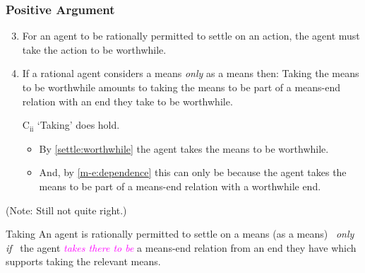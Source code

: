 \documentclass[noamssymb, compress, handout]{beamer} %
\newcommand{\hozlinedash}[0]{%
  \noindent\hdashrule[0.5ex][c]{\textwidth}{.1pt}{2.5pt}
}
\begin{document}
\begin{frame}
    \frametitle{Positive Argument}

  \begin{enumerate}
    \setcounter{enumi}{2}
  \item\label{settle:worthwhile} For an agent to be rationally permitted to settle on an action, the agent must take the action to be worthwhile.
  \item\label{m-e:dependence} If a rational agent considers a means \emph{only} as a means then: \newline Taking the means to be worthwhile amounts to taking the means to be part of a means-end relation with an end they take to be worthwhile.
    \item[C\(_{\text{ii}}\)] `Taking' does hold.
    \begin{itemize}
    \item By \ref{settle:worthwhile} the agent takes the means to be worthwhile.
    \item And, by \ref{m-e:dependence} this can only be because the agent takes the means to be part of a means-end relation with a worthwhile end.
    \end{itemize}
  \end{enumerate}

  (Note: Still not quite right.)

  \hozlinedash

  {\footnotesize
    \begin{block}{Taking}
      An agent is rationally permitted to settle on a means (as a means)
      \newline
      \mbox{ }\hfill\emph{only if}\hfill\mbox{ }
      \newline
      the agent \textcolor{fuchsia}{\emph{takes there to be}}  a means-end relation from an end they have which supports taking the relevant means.
    \end{block}
  }
\end{frame}
\end{document}
